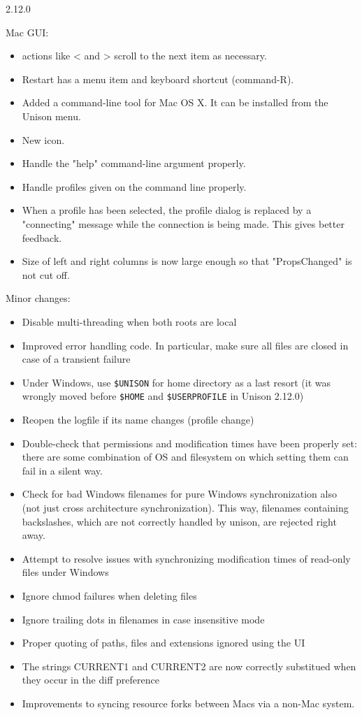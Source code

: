 \begin{changesfromversion}{2.12.0}
\item Mac GUI:
\begin{itemize}
\item actions like < and > scroll to the next item as necessary.
\item Restart has a menu item and keyboard shortcut (command-R).
\item 
    Added a command-line tool for Mac OS X.  It can be installed from
    the Unison menu.
\item New icon.
\item   Handle the "help" command-line argument properly.
\item   Handle profiles given on the command line properly.
\item  When a profile has been selected, the profile dialog is replaced by a
    "connecting" message while the connection is being made.  This
    gives better feedback.
\item   Size of left and right columns is now large enough so that
    "PropsChanged" is not cut off.
\end{itemize}


\item Minor changes:
\begin{itemize}
\item Disable multi-threading when both roots are local
\item Improved error handling code.  In particular, make sure all files
  are closed in case of a transient failure
\item Under Windows, use \verb|$UNISON| for home directory as a last resort
  (it was wrongly moved before \verb|$HOME| and \verb|$USERPROFILE| in
  Unison 2.12.0)
\item Reopen the logfile if its name changes (profile change)
\item Double-check that permissions and modification times have been
  properly set: there are some combination of OS and filesystem on
  which setting them can fail in a silent way.
\item Check for bad Windows filenames for pure Windows synchronization
  also (not just cross architecture synchronization).
  This way, filenames containing backslashes, which are not correctly
  handled by unison, are rejected right away.
\item Attempt to resolve issues with synchronizing modification times
  of read-only files under Windows
\item Ignore chmod failures when deleting files
\item Ignore trailing dots in filenames in case insensitive mode
\item Proper quoting of paths, files and extensions ignored using the UI
\item The strings CURRENT1 and CURRENT2 are now correctly substitued when
  they occur in the diff preference
\item Improvements to syncing resource forks between Macs via a non-Mac system.
\end{itemize}

\end{changesfromversion}

